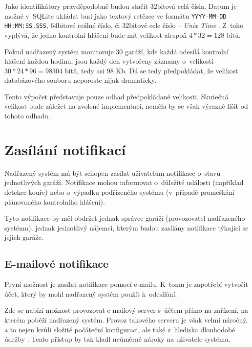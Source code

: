 Jako identifikátory pravděpodobně budou stačit 32bitová celá čísla. Datum je možné v~SQLite ukládat buď jako textový retězec ve formátu \texttt{YYYY-MM-DD HH:MM:SS.SSS}, 64bitové reálné číslo, či 32bitové cele číslo -- \textit{Unix Time} \cite{sqlite_datetypes}. Z~toho vyplývá, že jedno kontrolní hlášení bude mít velikost alespoň $4 * 32 = 128$ bitů.

Pokud nadřazený systém monitoruje 30 garáží, kde každá odesílá kontrolní hlášení každou hodinu, jsou každý den vytvořeny záznamy o~velikosti $30 * 24 * 96 = 98304$ bitů, tedy asi 98 Kb. Dá se tedy předpokládat, že velikost databázového souboru neporoste nijak dramaticky.

Tento výpočet představuje pouze odhad předpokládané velikosti. Skutečná velikost bude záležet na zvolené implementaci, neměla by se však výrazně lišit od tohoto odhadu.


\section{Zasílání notifikací}
\label{sec:an_notify}

Nadřazený systém má být schopen zasílat uživatelům notifikace o~stavu jednotlivých garáží. Notifikace mohou informovat o~důležité události (například detekce kouře) nebo o~výpadku podřízeného systému (v~případě promeškání plánovaného kontrolního hlášení).

Tyto notifikace by měl obdržet jednak správce garáží (provozovatel nadřazeného systému), jednak jednotlivý nájemci, kterým budou zasílány notifikace týkající se jejich garáže.

\subsection{E-mailové notifikace}

První možnost je zasílat notifikace pomocí e-mailu. K~tomu je zapotřebí vytvořit účet, který by mohl nadřazený systém použít k~odesílání.

Zde se nabízí možnost provozovat e-mailový server s~účtem přímo na zařízení, na kterém poběží nadřazený systém. Provoz takového serveru je však velmi náročný, a to nejen kvůli složité počáteční konfiguraci, ale také z~hlediska dlouhodobé údržby \cite{email_dont}. Tento přístup by tak kladl neúměrné nároky na uživatele systému.

